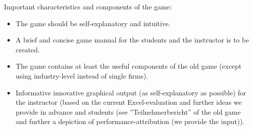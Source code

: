 Important characteristics and components of the game:
\begin{itemize}
  \item The game should be self-explanatory and intuitive.
  \item A brief and concise game manual for the students and the instructor is to be created.
  \item The game contains at least the useful components of the old game (except using industry-level instead of single firms).
  \item Informative innovative graphical output (as self-explanatory as possible) for the instructor (based on the current Excel-evaluation and further ideas we provide in advance and students (see ''Teilnehmerbericht'' of the old game and further a depiction of performance-attribution (we provide the input)).
\end{itemize}
